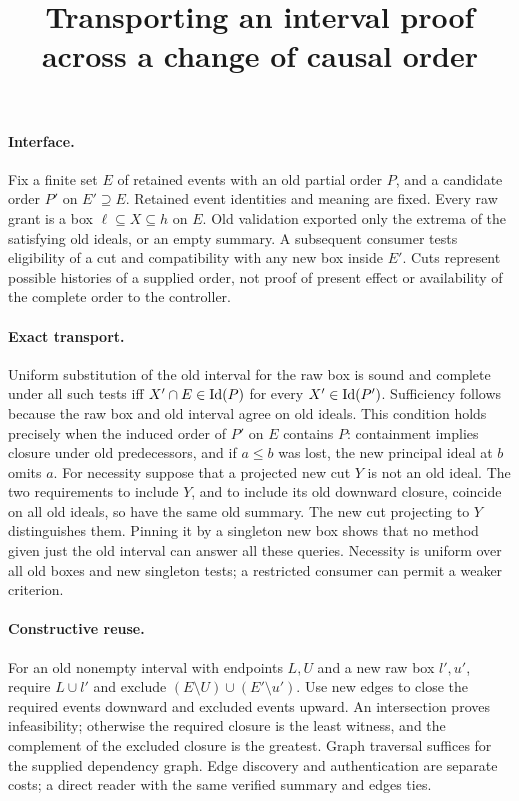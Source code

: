 \documentclass{article}
\title{Transporting an interval proof across a change of causal order}
\begin{document}
\maketitle
\paragraph{Interface.}
Fix a finite set \(E\) of retained events with an old partial order \(P\), and a candidate order \(P'\) on \(E'\supseteq E\). Retained event identities and meaning are fixed. Every raw grant is a box \(\ell\subseteq X\subseteq h\) on \(E\). Old validation exported only the extrema of the satisfying old ideals, or an empty summary. A subsequent consumer tests eligibility of a cut and compatibility with any new box inside \(E'\). Cuts represent possible histories of a supplied order, not proof of present effect or availability of the complete order to the controller.

\paragraph{Exact transport.}
Uniform substitution of the old interval for the raw box is sound and complete under all such tests iff \(X'\cap E\in{\rm Id}(P)\) for every \(X'\in{\rm Id}(P')\). Sufficiency follows because the raw box and old interval agree on old ideals. This condition holds precisely when the induced order of \(P'\) on \(E\) contains \(P\): containment implies closure under old predecessors, and if \(a\le b\) was lost, the new principal ideal at \(b\) omits \(a\). For necessity suppose that a projected new cut \(Y\) is not an old ideal. The two requirements to include \(Y\), and to include its old downward closure, coincide on all old ideals, so have the same old summary. The new cut projecting to \(Y\) distinguishes them. Pinning it by a singleton new box shows that no method given just the old interval can answer all these queries. Necessity is uniform over all old boxes and new singleton tests; a restricted consumer can permit a weaker criterion.

\paragraph{Constructive reuse.}
For an old nonempty interval with endpoints \(L,U\) and a new raw box \(l',u'\), require \(L\cup l'\) and exclude \((E\setminus U)\cup(E'\setminus u')\). Use new edges to close the required events downward and excluded events upward. An intersection proves infeasibility; otherwise the required closure is the least witness, and the complement of the excluded closure is the greatest. Graph traversal suffices for the supplied dependency graph. Edge discovery and authentication are separate costs; a direct reader with the same verified summary and edges ties.
\end{document}
